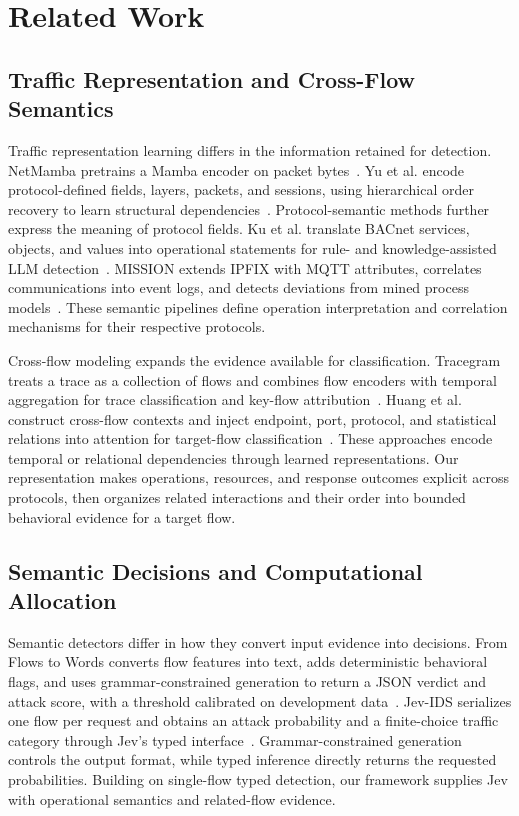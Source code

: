 \section{Related Work}\label{sec:related-work}
\subsection{Traffic Representation and Cross-Flow Semantics}

Traffic representation learning differs in the information retained for detection.
NetMamba pretrains a Mamba encoder on packet bytes~\cite{R06}.
Yu et al. encode protocol-defined fields, layers, packets, and sessions, using hierarchical order recovery to learn structural dependencies~\cite{E01}.
Protocol-semantic methods further express the meaning of protocol fields.
Ku et al. translate BACnet services, objects, and values into operational statements for rule- and knowledge-assisted LLM detection~\cite{R12}.
MISSION extends IPFIX with MQTT attributes, correlates communications into event logs, and detects deviations from mined process models~\cite{R13}.
These semantic pipelines define operation interpretation and correlation mechanisms for their respective protocols.

Cross-flow modeling expands the evidence available for classification.
Tracegram treats a trace as a collection of flows and combines flow encoders with temporal aggregation for trace classification and key-flow attribution~\cite{R01}.
Huang et al. construct cross-flow contexts and inject endpoint, port, protocol, and statistical relations into attention for target-flow classification~\cite{R07}.
These approaches encode temporal or relational dependencies through learned representations.
Our representation makes operations, resources, and response outcomes explicit across protocols, then organizes related interactions and their order into bounded behavioral evidence for a target flow.

\subsection{Semantic Decisions and Computational Allocation}

Semantic detectors differ in how they convert input evidence into decisions.
From Flows to Words converts flow features into text, adds deterministic behavioral flags, and uses grammar-constrained generation to return a JSON verdict and attack score, with a threshold calibrated on development data~\cite{R14}.
Jev-IDS serializes one flow per request and obtains an attack probability and a finite-choice traffic category through Jev's typed interface~\cite{R02}.
Grammar-constrained generation controls the output format, while typed inference directly returns the requested probabilities.
Building on single-flow typed detection, our framework supplies Jev with operational semantics and related-flow evidence.

